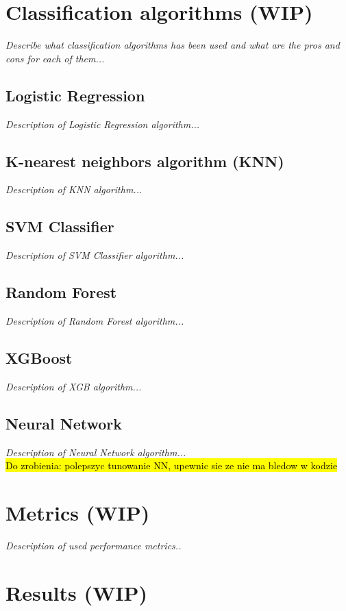 \section{Classification algorithms (WIP)}
\textit{Describe what classification algorithms has been used and what are the pros and cons for each of them...}

\subsection{Logistic Regression}
\textit{Description of Logistic Regression algorithm...}

\subsection{K-nearest neighbors algorithm (KNN)}
\textit{Description of KNN algorithm...}

\subsection{SVM Classifier}
\textit{Description of SVM Classifier algorithm...}

\subsection{Random Forest}
\textit{Description of Random Forest algorithm...}

\subsection{XGBoost}
\textit{Description of XGB algorithm...}

\subsection{Neural Network}
\textit{Description of Neural Network algorithm...}
\\
\hl{Do zrobienia: polepszyc tunowanie NN, upewnic sie ze nie ma bledow w kodzie}

\section{Metrics (WIP)}
\textit{Description of used performance metrics..}


\section{Results (WIP)}

